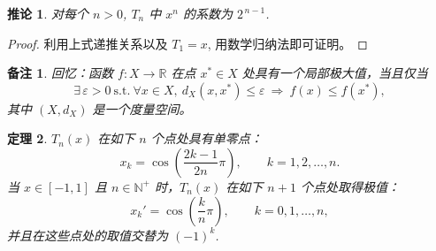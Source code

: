 \documentclass[a4paper]{ctexart}
\newtheorem{theorem}{定理}
\newtheorem{remark}{备注}
\newtheorem{corollary}[theorem]{推论}
\numberwithin{theorem}{section}
\numberwithin{equation}{section}
\numberwithin{figure}{section}
\numberwithin{remark}{section}
\begin{document}
\begin{corollary}
    \label{cor::chebyshev_coefficient}
对每个 $n>0$, $T_n$ 中 $x^n$ 的系数为 $2^{\,n-1}$.
\end{corollary}

\begin{proof}
利用上式递推关系以及 $T_1=x$, 用数学归纳法即可证明。
\end{proof}

\begin{remark}
回忆：函数 $f:X\to\mathbb{R}$ 在点 $x^*\in X$ 处具有一个局部极大值，当且仅当
\begin{equation*}
\exists\,\varepsilon>0\ \text{s.t.}\ \forall x\in X,\ d_X(x,x^*)\le \varepsilon \ \Rightarrow\ f(x)\le f(x^*),
\end{equation*}
其中 $(X,d_X)$ 是一个度量空间。
\end{remark}

\begin{theorem}
    \label{thm::chebyshev_zeros_extrema}
$T_n(x)$ 在如下 $n$ 个点处具有单零点：
\begin{equation}
    \label{eq::chebyshev_zeros}
x_k=\cos\!\left(\frac{2k-1}{2n}\pi\right),\qquad k=1,2,\ldots,n.
\end{equation}
当 $x\in[-1,1]$ 且 $n\in\mathbb{N}^+$ 时，$T_n(x)$ 在如下 $n+1$ 个点处取得极值：
\begin{equation}
    \label{eq::chebyshev_extrema}
x_k'=\cos\!\left(\frac{k}{n}\pi\right),\qquad k=0,1,\ldots,n,
\end{equation}
并且在这些点处的取值交替为 $(-1)^k$.
\end{theorem}
\end{document}
